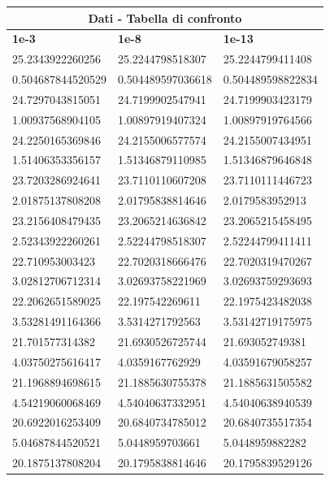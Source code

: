 \documentclass[10pt,a4paper]{article}
\begin{document}
\begin{center}
  \begin{longtable}{ |p{2.8cm}|p{2.8cm}|p{2.8cm}| }
    \hline
    \multicolumn{3}{|c|}{ \textbf{Dati - Tabella di confronto}} \\
    \hline
    \textbf{1e-3}     & \textbf{1e-8}     & \textbf{1e-13}      \\
    \hline
    25.2343922260256  & 25.2244798518307  & 25.2244799411408    \\
    0.504687844520529 & 0.504489597036618 & 0.504489598822834   \\
    24.7297043815051  & 24.7199902547941  & 24.7199903423179    \\
    1.00937568904105  & 1.00897919407324  & 1.00897919764566    \\
    24.2250165369846  & 24.2155006577574  & 24.2155007434951    \\
    1.51406353356157  & 1.51346879110985  & 1.51346879646848    \\
    23.7203286924641  & 23.7110110607208  & 23.7110111446723    \\
    2.01875137808208  & 2.01795838814646  & 2.0179583952913     \\
    23.2156408479435  & 23.2065214636842  & 23.2065215458495    \\
    2.52343922260261  & 2.52244798518307  & 2.52244799411411    \\
    22.710953003423   & 22.7020318666476  & 22.7020319470267    \\
    3.02812706712314  & 3.02693758221969  & 3.02693759293693    \\
    22.2062651589025  & 22.197542269611   & 22.1975423482038    \\
    3.53281491164366  & 3.5314271792563   & 3.53142719175975    \\
    21.701577314382   & 21.6930526725744  & 21.693052749381     \\
    4.03750275616417  & 4.0359167762929   & 4.03591679058257    \\
    21.1968894698615  & 21.1885630755378  & 21.1885631505582    \\
    4.54219060068469  & 4.54040637332951  & 4.54040638940539    \\
    20.6922016253409  & 20.6840734785012  & 20.6840735517354    \\
    5.04687844520521  & 5.0448959703661   & 5.0448959882282     \\
    20.1875137808204  & 20.1795838814646  & 20.1795839529126    \\

\end{longtable}
\end{center}
\end{document}
